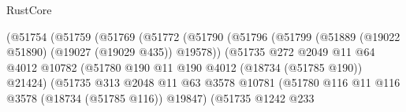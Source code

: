 \begin{lexlean}{RustCore}
\begin{coremodule}
                                        (@51754
                                          (@51759
                                            (@51769
                                              (@51772
                                                (@51790
                                                  (@51796
                                                    (@51799
                                                      (@51889
                                                        (@19022 @51890)
                                                        (@19027 (@19029 @435))
                                                        @19578))
                                                    (@51735
                                                      @272
                                                      @2049
                                                      @11
                                                      @64
                                                      @4012
                                                      @10782
                                                      (@51780
                                                        @190
                                                        @11
                                                        @190
                                                        @4012
                                                        (@18734 (@51785 @190))
                                                        @21424)
                                                      (@51735
                                                        @313
                                                        @2048
                                                        @11
                                                        @63
                                                        @3578
                                                        @10781
                                                        (@51780
                                                          @116
                                                          @11
                                                          @116
                                                          @3578
                                                          (@18734 (@51785 @116))
                                                          @19847)
                                                        (@51735
                                                          @1242
                                                          @233

\end{coremodule}
\end{lexlean}
